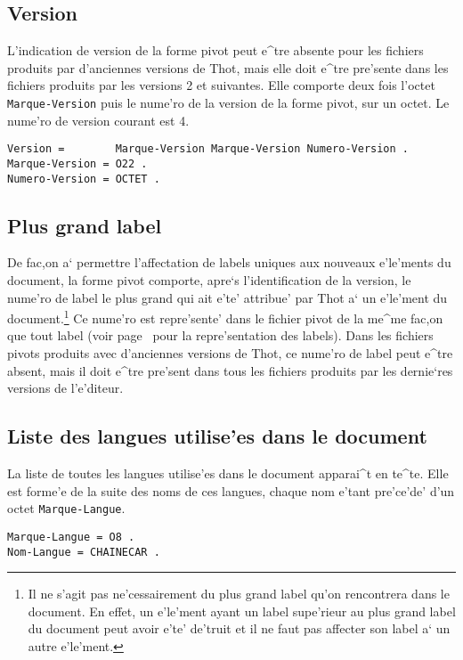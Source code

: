\subsection{Version}
\label{versionpivot}

L'indication de version de la forme pivot peut e^tre absente pour les
fichiers produits par d'anciennes versions de Thot, mais elle doit e^tre
pre'sente dans les
fichiers produits par les versions 2 et suivantes. Elle comporte deux fois
l'octet {\tt Marque-Version} puis le nume'ro de la version de la forme
pivot, sur un octet. Le nume'ro de version courant est 4.

\begin{verbatim}
Version =        Marque-Version Marque-Version Numero-Version .
Marque-Version = O22 .
Numero-Version = OCTET .
\end{verbatim}

\subsection{Plus grand label}

De fac,on a` permettre l'affectation de labels uniques aux nouveaux e'le'ments
du document, la forme pivot comporte, apre`s l'identification de la version,
le nume'ro de label le plus grand qui ait e'te' attribue' par Thot a` un
e'le'ment du document.\footnote{Il ne s'agit pas ne'cessairement du plus grand
label qu'on rencontrera dans le document. En effet, un e'le'ment ayant un label
supe'rieur au plus grand label du document peut avoir e'te' de'truit et il
ne faut pas affecter son label a` un autre e'le'ment.}
Ce nume'ro est repre'sente' dans le fichier pivot de la me^me fac,on que tout
label (voir page~\pageref{label} pour la repre'sentation des labels).
Dans les fichiers pivots produits avec d'anciennes versions de Thot, ce
nume'ro de label peut e^tre absent, mais il doit e^tre pre'sent dans tous les
fichiers produits par les dernie`res versions de l'e'diteur.

\subsection{Liste des langues utilise'es dans le document}
\label{listelangues}

La liste de toutes les langues utilise'es dans le document apparai^t en te^te.
Elle est forme'e de la suite des noms de ces langues, chaque nom e'tant
pre'ce'de' d'un octet {\tt Marque-Langue}.

\begin{verbatim}
Marque-Langue = O8 .
Nom-Langue = CHAINECAR .
\end{verbatim}

